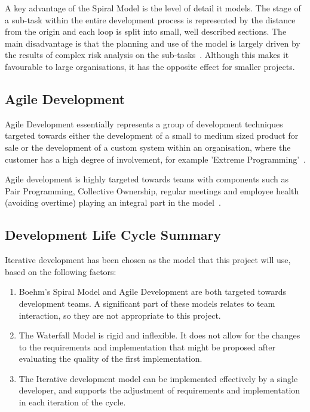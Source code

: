 \documentclass[authoryearcitations]{UoYCSproject}
\begin{document}
A key advantage of the Spiral Model is the level of detail it models.  The stage of a sub-task within the entire development process is represented by the distance from the origin and each loop is split into small, well described sections. The main disadvantage is that the planning and use of the model is largely driven by the results of complex risk analysis on the sub-tasks~\cite{sommervilleSoftwareEngineering}.  Although this makes it favourable to large organisations, it has the opposite effect for smaller projects.

\subsection{Agile Development}
Agile Development essentially represents a group of development techniques targeted towards either the development of a small to medium sized product for sale or the development of a custom system within an organisation, where the customer has a high degree of involvement, for example 'Extreme Programming'~\cite{sommervilleSoftwareEngineering}.

Agile development is highly targeted towards teams with components such as Pair Programming, Collective Ownership, regular meetings and employee health (avoiding overtime) playing an integral part in the model~\cite{sommervilleSoftwareEngineering}.

\subsection{Development Life Cycle Summary}
\label{sec:developmentLifeCycleSummary}
Iterative development has been chosen as the model that this project will use, based on the following factors:
\begin{enumerate}
  \item Boehm's Spiral Model and Agile Development are both targeted towards development teams.  A significant part of these models relates to team interaction, so they are not appropriate to this project.
  \item The Waterfall Model is rigid and inflexible.  It does not allow for the changes to the requirements and implementation that might be proposed after evaluating the quality of the first implementation.
  \item The Iterative development model can be implemented effectively by a single developer, and supports the adjustment of requirements and implementation in each iteration of the cycle.
\end{enumerate}
\end{document}
